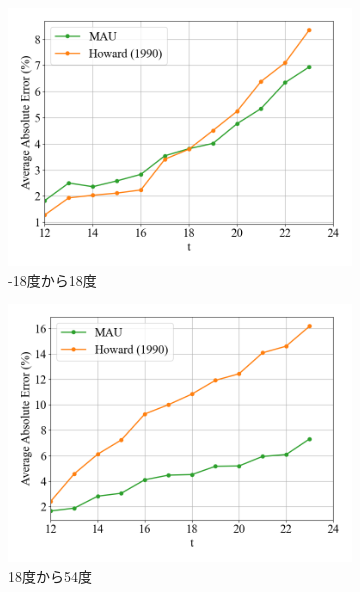\begin{figure}[htbp]
            \begin{subfigure}{0.5\textwidth}
              \centering
              \includegraphics[width=\textwidth]{figures/exp1/lng_error_3.png}
              \caption{-18度から18度}
            \end{subfigure}
            \begin{subfigure}{0.5\textwidth}
              \centering
              \includegraphics[width=\textwidth]{figures/exp1/lng_error_4.png}
              \caption{18度から54度}
            \end{subfigure} \par
            \begin{subfigure}{0.5\textwidth}
              \centering

\end{subfigure}
\end{figure}
